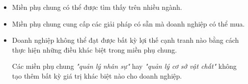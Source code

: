 \begin{itemize}

\item Miền phụ chung có thể được tìm thấy trên nhiều ngành.

\item Miền phụ chung cung cấp các giải pháp có sẵn mà doanh nghiệp có thể mua.

\item Doanh nghiệp không thể đạt được bất kỳ lợi thế cạnh tranh nào bằng cách thực hiện những điều khác biệt trong miền phụ chung.

\begin{example} Các miền phụ chung \textit{"quản lý nhân sự"} hay \textit{"quản lý cơ sở vật chất"} không tạo thêm bất kỳ giá trị khác biệt nào cho doanh nghiệp.

\end{example}

\end{itemize}